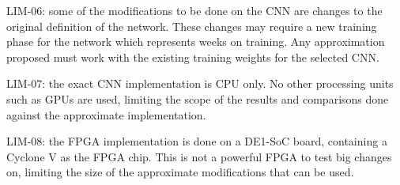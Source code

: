 LIM-06: some of the modifications to be done on the CNN are changes to the original definition of the network.
These changes may require a new training phase for the network which represents weeks on training.
Any approximation proposed must work with the existing training weights for the selected CNN.

LIM-07: the exact CNN implementation is CPU only. No other processing units
such as GPUs are used, limiting the scope of the results and comparisons
done against the approximate implementation.

LIM-08: the FPGA implementation is done on a DE1-SoC board, containing a Cyclone V as the FPGA chip.
This is not a powerful FPGA to test big changes on, limiting the size of the approximate modifications
that can be used.



            
